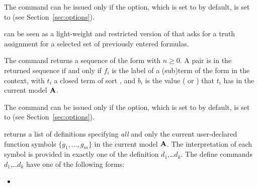 \begin{description}
The command can be issued only if the  option,
which is set to  by default, is set to  
(see Section~\ref{sec:options}).
\smallskip

%
\item[\expr{(get-assignment)}]
can be seen as a light-weight and restricted version of  
that asks for a truth assignment for a selected set 
of previously entered formulas.

The command returns a sequence of the form 
 with $n \geq 0$.
A pair  is in the returned sequence if and only if
$f_i$ is the label of a (sub)term of the form 
 in the context, 
with $t_i$ a closed term of sort ,
and 
$b_i$ is the value ( or ) 
that $t_i$ has in the current model $\mathbf{A}$.

The command can be issued only if the  option, 
which is set to  by default, is set to  
(see Section~\ref{sec:options}).  
\smallskip

%
\item[\expr{(get-model)}]
returns a list  of definitions specifying \emph{all} and only the current user-declared 
function symbols $\{g_1, \ldots, g_m\}$ in the current model $\mathbf{A}$.
The interpretation of each symbol is provided in exactly one of the definition 
$d_1$,\dots $d_k$.  The define commands $d_1$,\dots $d_k$ have one of the following forms:
%
\begin{itemize}
\item
{}


\end{itemize}
\end{description}
